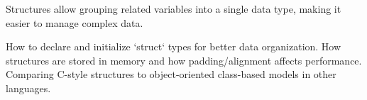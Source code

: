 \begin{comment}
4.4.1.2 Use Cases and Compiler Behavior

4.4.2 Advancements in Memory Safety

4.4.2.1 Struct Alignment with #pragma pack

4.4.2.2 Enhanced String Security Functions

4.5 C11 (2011 - 2018) – Multi-threaded and Atomic Data Handling
4.5.1 Atomic Operations on Data Structures

4.5.1.1 Using _Atomic for Safe Data Modification

4.5.1.2 Lock-Free Programming for Performance

4.5.2 Threads and Data Synchronization

4.5.2.1 <threads.h> and Struct-Based Thread Management

4.5.2.2 Avoiding Race Conditions in Data Structures

4.6 C17 and Beyond – Refinements and Future Directions
4.6.1 Standardization of Data Structures in New Architectures

4.6.1.1 SIMD-Friendly Data Alignment

4.6.1.2 Cache-Aware Struct Design

4.6.2 Alternative Data Representations in Modern Computing

4.6.2.1 Rust’s Borrow-Checked Data Structures

4.6.2.2 The Future of Self-Optimizing Structures in C
\end{comment}

\begin{NxSBox}[][Structures in C]
    \begin{NxIDBox}
        Structures allow grouping related variables into a single data type, making it easier to manage complex data.
    \end{NxIDBox}
    \begin{NxIDBoxL}
         How to declare and initialize `struct` types for better data organization.
         How structures are stored in memory and how padding/alignment affects performance.
         Comparing C-style structures to object-oriented class-based models in other languages.
    \end{NxIDBoxL}
\end{NxSBox}

